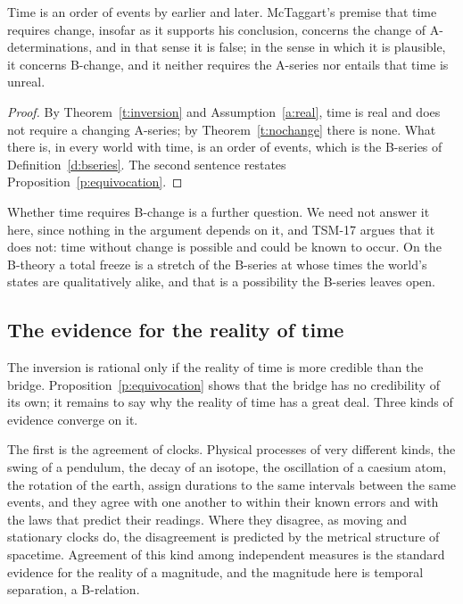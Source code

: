 \documentclass{situationist-preprint}
\begin{document}
\begin{corollary}\label{c:survives}
Time is an order of events by earlier and later. McTaggart's premise that time requires change, insofar as it supports his conclusion, concerns the change of A-determinations, and in that sense it is false; in the sense in which it is plausible, it concerns B-change, and it neither requires the A-series nor entails that time is unreal.
\end{corollary}

\begin{proof}
By Theorem~\ref{t:inversion} and Assumption~\ref{a:real}, time is real and does not require a changing A-series; by Theorem~\ref{t:nochange} there is none. What there is, in every world with time, is an order of events, which is the B-series of Definition~\ref{d:bseries}. The second sentence restates Proposition~\ref{p:equivocation}.
\end{proof}

Whether time requires B-change is a further question. We need not answer it here, since nothing in the argument depends on it, and TSM-17 argues that it does not: time without change is possible and could be known to occur. On the B-theory a total freeze is a stretch of the B-series at whose times the world's states are qualitatively alike, and that is a possibility the B-series leaves open.

\subsection{The evidence for the reality of time}

The inversion is rational only if the reality of time is more credible than the bridge. Proposition~\ref{p:equivocation} shows that the bridge has no credibility of its own; it remains to say why the reality of time has a great deal. Three kinds of evidence converge on it.

The first is the agreement of clocks. Physical processes of very different kinds, the swing of a pendulum, the decay of an isotope, the oscillation of a caesium atom, the rotation of the earth, assign durations to the same intervals between the same events, and they agree with one another to within their known errors and with the laws that predict their readings. Where they disagree, as moving and stationary clocks do, the disagreement is predicted by the metrical structure of spacetime. Agreement of this kind among independent measures is the standard evidence for the reality of a magnitude, and the magnitude here is temporal separation, a B-relation.
\end{document}
